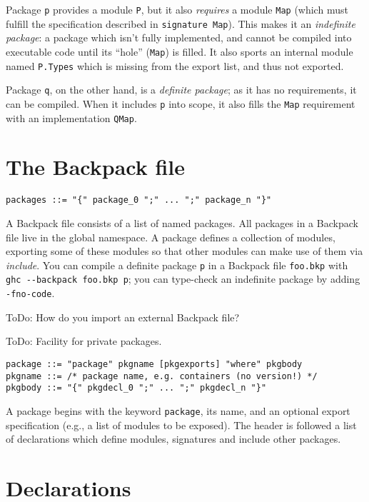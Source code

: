 \documentclass{article}
\newcommand{\Red}[1]{{\color{red} #1}}
\begin{document}
Package \verb|p| provides a module \verb|P|, but it also \emph{requires}
a module \verb|Map| (which must fulfill the specification described
in \verb|signature Map|).  This makes it an \emph{indefinite package}:
a package which isn't fully implemented, and cannot be compiled into
executable code until its ``hole'' (\verb|Map|) is filled.
It also sports an internal module named \verb|P.Types| which
is missing from the export list, and thus not exported.

Package \verb|q|, on the other hand, is a \emph{definite package}; as it
has no requirements, it can be compiled.  When it includes \verb|p|
into scope, it also fills the \verb|Map| requirement with an
implementation \verb|QMap|.

\section{The Backpack file}

\begin{verbatim}
packages ::= "{" package_0 ";" ... ";" package_n "}"
\end{verbatim}

A Backpack file consists of a list of named packages.
All packages in a Backpack file live in the global namespace.
A package defines a collection of modules, exporting some of
these modules so that other modules can make use of them via
\emph{include}.  You can compile a definite package \verb|p| in a Backpack file \verb|foo.bkp|
with \verb|ghc --backpack foo.bkp p|; you can type-check an indefinite package by
adding \verb|-fno-code|.

\Red{ToDo: How do you import an external Backpack file?}

\Red{ToDo: Facility for private packages.}

\begin{verbatim}
package ::= "package" pkgname [pkgexports] "where" pkgbody
pkgname ::= /* package name, e.g. containers (no version!) */
pkgbody ::= "{" pkgdecl_0 ";" ... ";" pkgdecl_n "}"
\end{verbatim}

A package begins with the keyword \verb|package|, its name, and an
optional export specification (e.g., a list of modules to be exposed).
The header is followed a list of declarations which define modules,
signatures and include other packages.

\section{Declarations}
\end{document}
